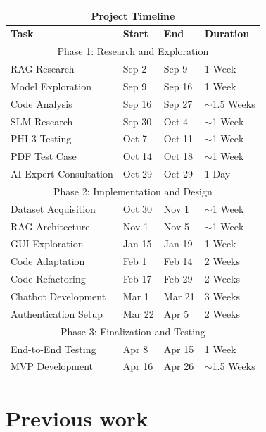 \documentclass[12pt]{report}
\begin{document}
\begin{tabular}{ |p{4cm}||p{3cm}|p{3cm}|p{3cm}| }
  \hline
  \multicolumn{4}{|c|}{Project Timeline} \\
  \hline
  \textbf{Task} & \textbf{Start} & \textbf{End} & \textbf{Duration} \\
  \hline
  \multicolumn{4}{|c|}{Phase 1: Research and Exploration} \\
  \hline
  RAG Research & Sep 2 & Sep 9 & 1 Week \\
  \hline
  Model Exploration & Sep 9 & Sep 16 & 1 Week \\
  \hline
  Code Analysis & Sep 16 & Sep 27 & $\sim$1.5 Weeks \\
  \hline
  SLM Research & Sep 30 & Oct 4 & $\sim$1 Week \\
  \hline
  PHI-3 Testing & Oct 7 & Oct 11 & $\sim$1 Week \\
  \hline
  PDF Test Case & Oct 14 & Oct 18 & $\sim$1 Week \\
  \hline
  AI Expert Consultation & Oct 29 & Oct 29 & 1 Day \\
  \hline
  \multicolumn{4}{|c|}{Phase 2: Implementation and Design} \\
  \hline
  Dataset Acquisition & Oct 30 & Nov 1 & $\sim$1 Week \\
  \hline
  RAG Architecture & Nov 1 & Nov 5 & $\sim$1 Week \\
  \hline
  GUI Exploration & Jan 15 & Jan 19 & 1 Week \\
  \hline
  Code Adaptation & Feb 1 & Feb 14 & 2 Weeks \\
  \hline
  Code Refactoring & Feb 17 & Feb 29 & 2 Weeks \\
  \hline
  Chatbot Development & Mar 1 & Mar 21 & 3 Weeks \\
  \hline
  Authentication Setup & Mar 22 & Apr 5 & 2 Weeks \\
  \hline
  \multicolumn{4}{|c|}{Phase 3: Finalization and Testing} \\
  \hline
  End-to-End Testing & Apr 8 & Apr 15 & 1 Week \\
  \hline
  MVP Development & Apr 16 & Apr 26 & $\sim$1.5 Weeks \\
  \hline
 \end{tabular}

\section{Previous work}
\end{document}
